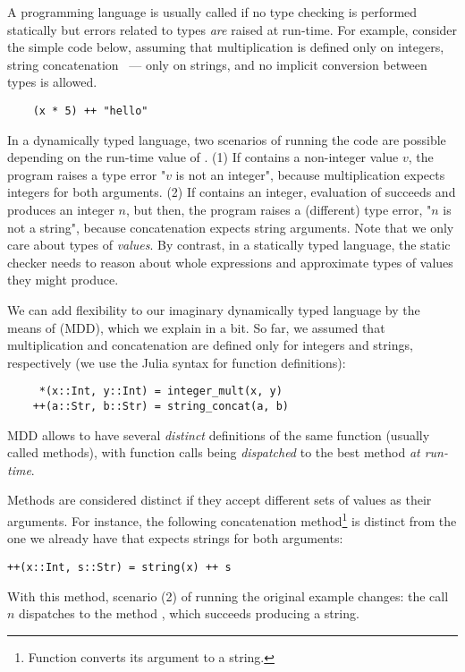 A programming language is usually called 
if no type checking is performed statically
but errors related to types \emph{are} raised at run-time.
For example, consider the simple code below, assuming that
multiplication \jlcode{(*)} is defined only on integers, 
string concatenation \jlcode{(++)}~--- only on strings,
and no implicit conversion between types is allowed.
\begin{verbatim}
    (x * 5) ++ "hello"
\end{verbatim}
In a dynamically typed language, two scenarios of running the code are possible
depending on the run-time value of .
(1) If  contains a non-integer value $v$, 
the program raises a type error "$v$ is not an integer",
because multiplication expects integers for both arguments.
(2) If  contains an integer,
evaluation of  succeeds and produces an integer $n$,
but then, the program raises a (different) type error, "$n$ is not a string", 
because concatenation expects string arguments.
Note that we only care about %
types of \emph{values}. By contrast, in a statically typed language,
the static checker needs to reason about whole expressions and approximate
types of values they might produce.

We can add flexibility to our imaginary dynamically typed language
by the means of  (MDD), 
which we explain in a bit.
So far, we assumed that multiplication and concatenation are defined only
for integers and strings, respectively
(we use the Julia syntax for function definitions):
\begin{verbatim}
     *(x::Int, y::Int) = integer_mult(x, y)
    ++(a::Str, b::Str) = string_concat(a, b)
\end{verbatim}
MDD allows to have several \emph{distinct} definitions of the same function
(usually called methods), with function calls being \emph{dispatched} 
to the best method \emph{at run-time}.

Methods are considered distinct if they accept different sets 
of values as their arguments. For instance, the following concatenation 
method\footnote{Function  converts its argument to a string.} 
is distinct from the one we already have 
that expects strings for both arguments:
\begin{verbatim}
++(x::Int, s::Str) = string(x) ++ s
\end{verbatim}
With this method, scenario (2) of running the original example changes:
the call $n$ dispatches to the method
, which succeeds producing a string.

